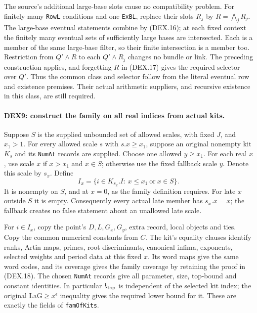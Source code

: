 \documentclass[11pt,a4paper]{article}
\numberwithin{equation}{section}
\theoremstyle{remark}\newtheorem{remark}[theorem]{Remark}
\begin{document}
The source's additional large-base slots cause no compatibility problem.
For finitely many \texttt{RowL} conditions and one \texttt{ExBL},
replace their slots $R_j$ by $R=\bigwedge_jR_j$. The large-base
eventual statements combine by (DEX.16); at each fixed context the
finitely many eventual sets of sufficiently large bases are intersected.
Each is a member of the same large-base filter, so their finite
intersection is a member too. Restriction from $Q'\wedge R$
to each $Q'\wedge R_j$ changes no bundle or link. The preceding
construction applies, and forgetting $R$ in (DEX.17) gives the required
selector over $Q'$. Thus the common class and selector follow from the
literal eventual row and existence premises. Their actual arithmetic
suppliers, and recursive existence in this class, are still required.

\paragraph{DEX9: construct the family on all real indices from actual kits.}
\label{claim:DEX9}
Suppose $S$ is the supplied unbounded set of allowed scales, with
fixed $J$, and $x_1>1$. For every allowed scale $s$ with
$s.x\ge x_1$, suppose an original nonempty kit $K_s$ and its
\texttt{NumAt} records are supplied. Choose one allowed $y\ge x_1$.
For each real $x$, use scale $x$ if $x>x_1$ and $x\in S$;
otherwise use the fixed fallback scale $y$. Denote this scale by $s_x$.
Define
\[
 I_x=\{i\in K_{s_x}.I:\ x\le x_1\ \text{or}\ x\in S\}.    \tag{DEX.18}
\]
It is nonempty on $S$, and at $x=0$, as the family definition requires.
For late $x$ outside $S$ it is empty. Consequently every actual late
member has $s_x.x=x$; the fallback creates no false statement about
an unallowed late scale.

For $i\in I_x$, copy the point's $D,L,G_x,G_y$, extra record,
local objects and ties. Copy the common numerical constants from $C$.
The kit's equality clauses identify ranks, Artin maps, primes, root
discriminants, canonical infima, exponents, selected weights and
period data at this fixed $x$. Its word maps give the same word codes,
and its coverage gives the family coverage by retaining the proof in
(DEX.18). The chosen \texttt{NumAt} records give all parameter, size,
top-bound and constant identities. In particular $b_{\rm top}$ is
independent of the selected kit index; the original
$\mathrm{LaG}\ge x^\epsilon$ inequality gives the required lower
bound for it. These are exactly the fields of \texttt{famOfKits}.
\end{document}
